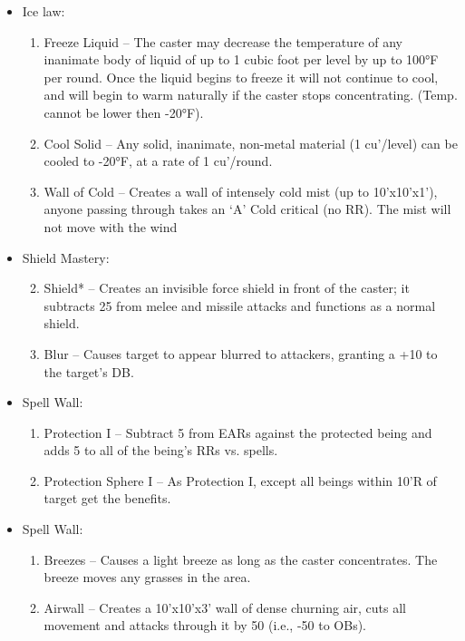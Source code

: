 \documentclass[oneside,12pt]{book}
\begin{document}
\begin{flushleft}
\begin{description}
{\begin{itemize}
\begin{enumerate}
the Bolt Attack Table (Max result of 90, inflicting
Electrical criticals.)
\item Light I – Lights a 10’R area about the point touched. If
this spell is cast onto a target they get a RR, if the RR
succeeds, the area of effect is centered on the point
where they are standing, but will not move with them.
If the target fails the RR the area of effect sticks to the
target and will follow with them until it is dispelled,
or the duration ends.
\end{enumerate}
\item Ice law:
\begin{enumerate}
\scriptsize
\item Freeze Liquid – The caster may decrease the
temperature of any inanimate body of liquid of up to
1 cubic foot per level by up to 100°F per round. Once
the liquid begins to freeze it will not continue to cool,
and will begin to warm naturally if the caster stops
concentrating. (Temp. cannot be lower then -20°F).
\item Cool Solid – Any solid, inanimate, non-metal material (1
cu’/level) can be cooled to -20°F, at a rate of 1 cu’/round.
\item Wall of Cold – Creates a wall of intensely cold mist (up to
10’x10’x1'), anyone passing through takes an ‘A’ Cold
critical (no RR). The mist will not move with the wind
\end{enumerate}
\item Shield Mastery:
\begin{enumerate}
\setcounter{enumi}{1}
\scriptsize
\item Shield* – Creates an invisible force shield in front of the
caster; it subtracts 25 from melee and missile attacks
and functions as a normal shield.
\item Blur – Causes target to appear blurred to attackers,
granting a +10 to the target’s DB.
\end{enumerate}
\item Spell Wall:
\begin{enumerate}
\scriptsize
\item Protection I – Subtract 5 from EARs against the protected
being and adds 5 to all of the being’s RRs vs. spells.
\setcounter{enumi}{2}
\item  Protection Sphere I – As Protection I, except all beings
within 10’R of target get the benefits.
\end{enumerate}
\item Spell Wall:
\begin{enumerate}
\scriptsize
\item Breezes – Causes a light breeze as long as the caster
concentrates. The breeze moves any grasses in the area.
\item Airwall – Creates a 10’x10’x3' wall of dense churning
air, cuts all movement and attacks through it by 50%
(i.e., -50 to OBs).
\end{enumerate}
\end{itemize}
}
\end{description}
\clearpage

\end{flushleft}
\end{document}
